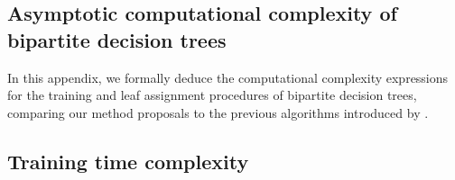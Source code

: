\documentclass[sn-mathphys-num]{sn-jnl}%
\theoremstyle{thmstyleone}%
\theoremstyle{thmstyletwo}%
\theoremstyle{thmstylethree}%
\begin{document}
\begin{appendices}


\section{Asymptotic computational complexity of bipartite decision trees}
\label{sec:complexity analysis}

In this appendix, we formally deduce the computational complexity expressions for the training and leaf assignment procedures of bipartite decision trees, comparing our method proposals to the previous algorithms introduced by \citet{pliakos_global_2018}.


\subsection{Training time complexity}
\label{sec:fit complexity analysis}


\end{appendices}
\end{document}
